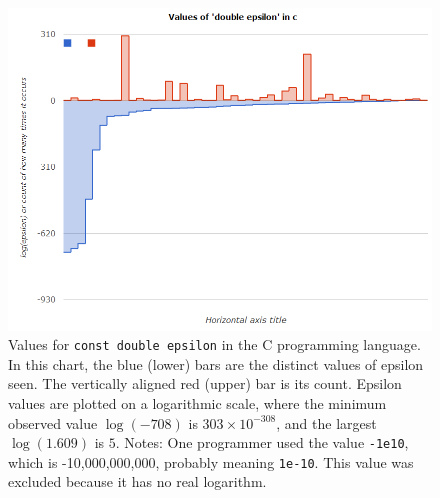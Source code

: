 \documentclass[twocolumn]{article}
\begin{document}
\begin{figure}[ht]
\begin{center}
\includegraphics[width=0.99 \linewidth]{chart-c-double}
\end{center}\vspace{-0.1in}
\caption{ Values for {\tt const double epsilon} in the C programming
  language. In this chart, the blue (lower) bars are the distinct values
  of epsilon seen. The vertically aligned red (upper) bar is its count.
  Epsilon values are plotted on a logarithmic scale, where the minimum
  observed value $\log(-708)$ is $303 \times 10^{-308}$, and the largest
  $\log(1.609)$ is $5$. 
  Notes: One programmer used the value {\tt -1e10}, which is
  -10,000,000,000, probably meaning {\tt 1e-10}. This value was excluded
  because it has no real logarithm.
}
\label{fig:cdouble}
\end{figure}
\end{document}
